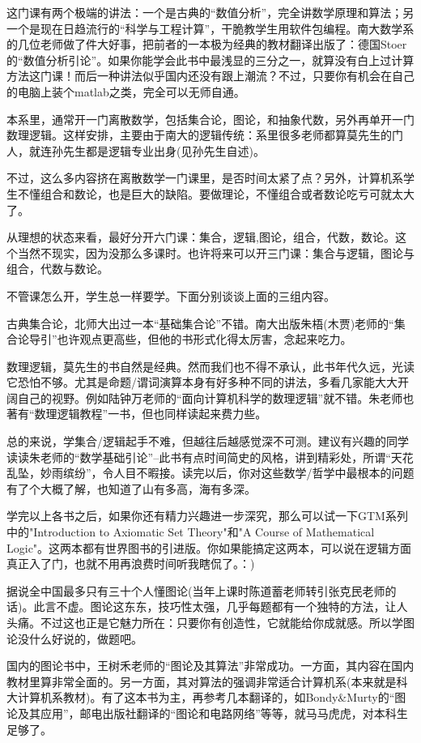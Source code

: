 这门课有两个极端的讲法：一个是古典的“数值分析”，完全讲数学原理和算法；另一个是现在日趋流行的“科学与工程计算”，干脆教学生用软件包编程。南大数学系的几位老师做了件大好事，把前者的一本极为经典的教材翻译出版了：德国Stoer的“数值分析引论”。如果你能学会此书中最浅显的三分之一，就算没有白上过计算方法这门课！而后一种讲法似乎国内还没有跟上潮流？不过，只要你有机会在自己的电脑上装个matlab之类，完全可以无师自通。 

本系里，通常开一门离散数学，包括集合论，图论，和抽象代数，另外再单开一门数理逻辑。这样安排，主要由于南大的逻辑传统：系里很多老师都算莫先生的门人，就连孙先生都是逻辑专业出身(见孙先生自述)。 

不过，这么多内容挤在离散数学一门课里，是否时间太紧了点？另外，计算机系学生不懂组合和数论，也是巨大的缺陷。要做理论，不懂组合或者数论吃亏可就太大了。 

从理想的状态来看，最好分开六门课：集合，逻辑,图论，组合，代数，数论。这个当然不现实，因为没那么多课时。也许将来可以开三门课：集合与逻辑，图论与组合，代数与数论。 

不管课怎么开，学生总一样要学。下面分别谈谈上面的三组内容。 

古典集合论，北师大出过一本“基础集合论”不错。南大出版朱梧(木贾)老师的“集合论导引”也许观点更高些，但他的书形式化得太厉害，念起来吃力。 

数理逻辑，莫先生的书自然是经典。然而我们也不得不承认，此书年代久远，光读它恐怕不够。尤其是命题/谓词演算本身有好多种不同的讲法，多看几家能大大开阔自己的视野。例如陆钟万老师的“面向计算机科学的数理逻辑”就不错。朱老师也著有“数理逻辑教程”一书，但也同样读起来费力些。 

总的来说，学集合/逻辑起手不难，但越往后越感觉深不可测。建议有兴趣的同学读读朱老师的“数学基础引论”--此书有点时间简史的风格，讲到精彩处，所谓“天花乱坠，妙雨缤纷”，令人目不暇接。读完以后，你对这些数学/哲学中最根本的问题有了个大概了解，也知道了山有多高，海有多深。 

学完以上各书之后，如果你还有精力兴趣进一步深究，那么可以试一下GTM系列中的"Introduction to Axiomatic Set Theory"和"A Course of Mathematical Logic"。这两本都有世界图书的引进版。你如果能搞定这两本，可以说在逻辑方面真正入了门，也就不用再浪费时间听我瞎侃了。：) 

据说全中国最多只有三十个人懂图论(当年上课时陈道蓄老师转引张克民老师的话)。此言不虚。图论这东东，技巧性太强，几乎每题都有一个独特的方法，让人头痛。不过这也正是它魅力所在：只要你有创造性，它就能给你成就感。所以学图论没什么好说的，做题吧。 

国内的图论书中，王树禾老师的“图论及其算法”非常成功。一方面，其内容在国内教材里算非常全面的。另一方面，其对算法的强调非常适合计算机系(本来就是科大计算机系教材)。有了这本书为主，再参考几本翻译的，如Bondy\&Murty的“图论及其应用”，邮电出版社翻译的“图论和电路网络”等等，就马马虎虎，对本科生足够了。 


